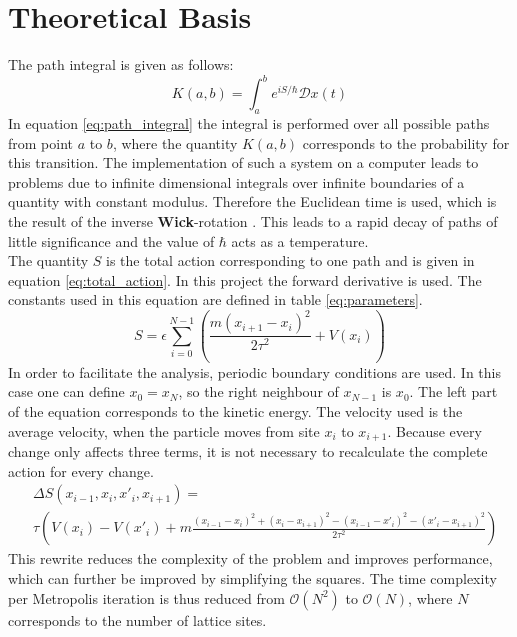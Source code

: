 \documentclass{scrartcl}
\begin{document}
	\section{Theoretical Basis}
		The path integral is given as follows:
		\begin{equation}
			K(a, b) = \int_a^b e^{iS/\hbar} \mathcal Dx(t)
			\label{eq:path_integral}
		\end{equation}
		In equation \ref{eq:path_integral} the integral is performed over all possible paths from point $a$ to $b$, where the quantity $K(a, b)$ corresponds to the probability for this transition.
		The implementation of such a system on a computer leads to problems due to infinite dimensional integrals over infinite boundaries of a quantity with constant modulus.
		Therefore the Euclidean time is used, which is the result of the inverse \textbf{Wick}-rotation \cite{wick}.
		This leads to a rapid decay of paths of little significance and the value of $\hbar$ acts as a temperature.
		\\
		The quantity $S$ is the total action corresponding to one path and is given in equation \ref{eq:total_action}.
		In this project the forward derivative is used.
		The constants used in this equation are defined in table \ref{eq:parameters}.
		\begin{equation}
			S = \epsilon \sum_{i=0}^{N - 1} \left(\frac{m(x_{i+1} - x_i)^2}{2\tau^2} + V(x_i)\right)
			\label{eq:total_action}
		\end{equation}
		In order to facilitate the analysis, periodic boundary conditions are used.
		In this case one can define $x_0 = x_N$, so the right neighbour of $x_{N-1}$ is $x_0$.
		The left part of the equation corresponds to the kinetic energy.
		The velocity used is the average velocity, when the particle moves from site $x_i$ to $x_{i+1}$.
		Because every change only affects three terms, it is not necessary to recalculate the complete action for every change.
		\begin{align}
			&\Delta S(x_{i-1}, x_i, x'_i, x_{i+1}) =\nonumber\\
			&\tau\left(V(x_i) - V(x'_i) + m\frac{(x_{i-1} - x_i)^2 + (x_i - x_{i+1})^2 - (x_{i-1} - x'_i)^2 - (x'_i - x_{i+1})^2}{2\tau^2}\right)
			\label{eq:delta_total_action}
		\end{align}
		This rewrite reduces the complexity of the problem and improves performance, which can further be improved by simplifying the squares.
		The time complexity per Metropolis iteration is thus reduced from $\mathcal O(N^2)$ to $\mathcal O(N)$, where $N$ corresponds to the number of lattice sites.
\end{document}
